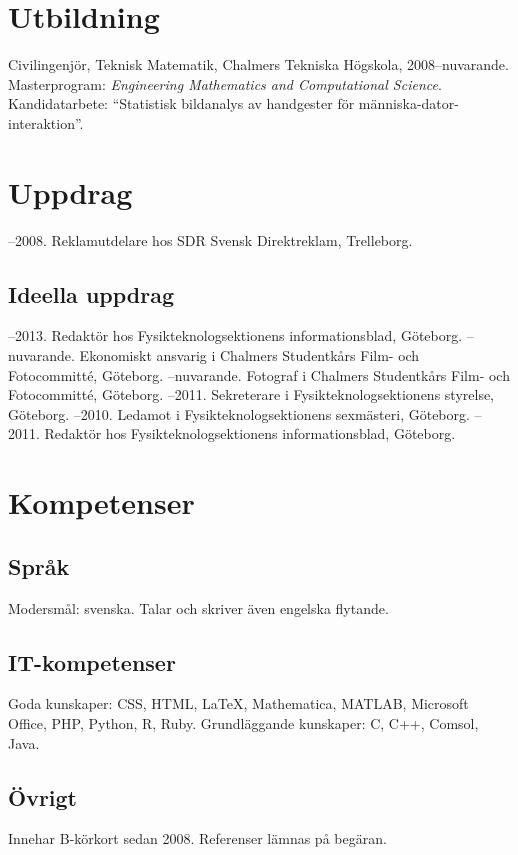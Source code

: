 \documentclass{skvitae}
\author{Simon Sigurdhsson}
\affiliation{}
\begin{document}
	\maketitle

	\section{Utbildning}
	\ind Civilingenjör, Teknisk Matematik, Chalmers Tekniska Högskola, 2008--nuvarande.\\Masterprogram: \emph{Engineering Mathematics and Computational Science}.\\Kandidatarbete: \enquote{Statistisk bildanalys av handgester för människa-dator-interaktion}.

	\section{Uppdrag}
	--2008. Reklamutdelare hos SDR Svensk Direktreklam, Trelleborg.

	\medskip
	\subsection{Ideella uppdrag}
	--2013. Redaktör hos Fysikteknologsektionens informationsblad, Göteborg.
	--nuvarande. Ekonomiskt ansvarig i Chalmers Studentkårs Film- och Fotocommitté, Göteborg.
	--nuvarande. Fotograf i Chalmers Studentkårs Film- och Fotocommitté, Göteborg.
	--2011. Sekreterare i Fysikteknologsektionens styrelse, Göteborg.
	--2010. Ledamot i Fysikteknologsektionens sexmästeri, Göteborg.
	--2011. Redaktör hos Fysikteknologsektionens informationsblad, Göteborg.

	\section{Kompetenser}
	\subsection{Språk}
	\ind Modersmål: svenska. Talar och skriver även engelska flytande.

	\medskip
	\subsection{IT-kompetenser}
	\ind Goda kunskaper: CSS, HTML, \LaTeX, Mathematica, MATLAB, Microsoft Office, PHP, Python, R, Ruby.
	\ind Grundläggande kunskaper: C, C++, Comsol, Java.

	\medskip
	\subsection{Övrigt}
	\ind Innehar B-körkort sedan 2008.
	\ind Referenser lämnas på begäran.
\end{document}
